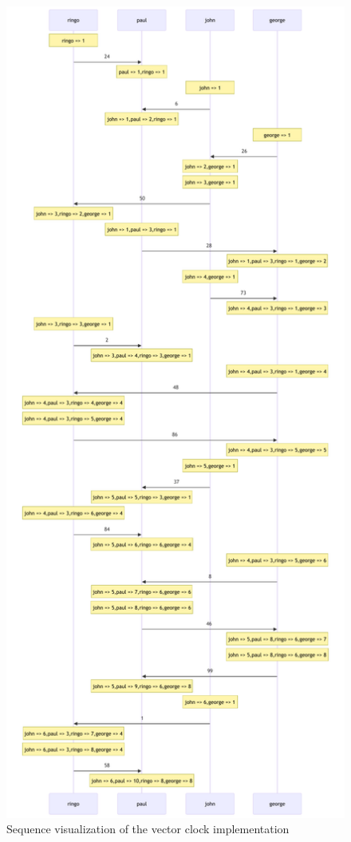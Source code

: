 \documentclass[a4paper, 11pt]{article}
\begin{document}
\begin{figure}[H]
  \begin{center}
    \includegraphics[height=\textheight]{graphics/mermaid_vector.pdf}
    \caption{Sequence visualization of the vector clock implementation}
    \label{fig:seq2}
  \end{center}
\end{figure}
\end{document}
